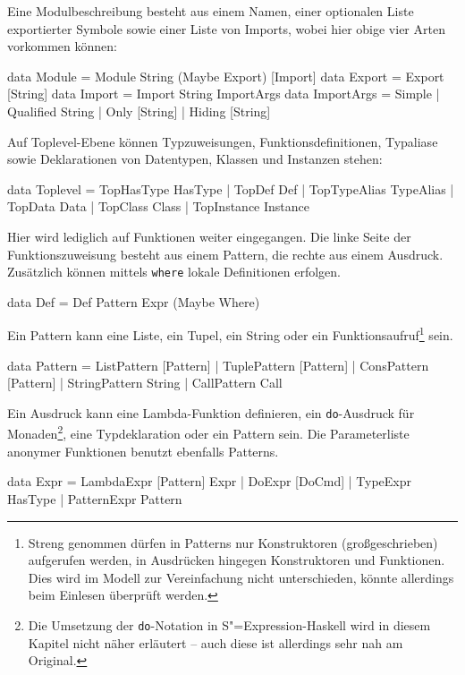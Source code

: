 \documentclass[11pt, a4paper, bibgerm]{scrbook}
\newenvironment{DIFnomarkup}{}{}
\newcommand\icode[1]{\lstinline?#1?}
\newcommand{\sexp}{S"=Expression}
\begin{document}
Eine Modulbeschreibung besteht aus einem Namen, einer optionalen Liste
exportierter Symbole sowie einer Liste von Imports, wobei hier obige
vier Arten vorkommen können:
\begin{DIFnomarkup}\begin{code}
data Module = Module String (Maybe Export) [Import]
data Export = Export [String]
data Import = Import String ImportArgs
data ImportArgs = Simple
                | Qualified String
                | Only [String]
                | Hiding [String]
\end{code}\end{DIFnomarkup}
Auf Toplevel-Ebene können Typzuweisungen, Funktionsdefinitionen,
Typaliase sowie Deklarationen von Datentypen, Klassen und Instanzen stehen:
\begin{DIFnomarkup}\begin{code}
data Toplevel = TopHasType HasType
              | TopDef Def
              | TopTypeAlias TypeAlias
              | TopData Data
              | TopClass Class
              | TopInstance Instance
\end{code}\end{DIFnomarkup}
Hier wird lediglich auf Funktionen weiter eingegangen. Die linke Seite der
Funktionszuweisung besteht aus einem Pattern, die rechte aus einem
Ausdruck. Zusätzlich können mittels \icode{where} lokale Definitionen
erfolgen.
\begin{DIFnomarkup}\begin{code}
data Def = Def Pattern Expr (Maybe Where)
\end{code}\end{DIFnomarkup}
Ein Pattern kann eine Liste, ein Tupel, ein String oder ein
Funktionsaufruf\footnote{Streng genommen dürfen in Patterns nur
  Konstruktoren (großgeschrieben) aufgerufen werden, in Ausdrücken
  hingegen Konstruktoren und Funktionen. Dies wird im Modell zur
  Vereinfachung nicht unterschieden, könnte allerdings beim Einlesen
  überprüft werden.} sein.
\begin{DIFnomarkup}\begin{code}
data Pattern = ListPattern [Pattern]
             | TuplePattern [Pattern]
             | ConsPattern [Pattern]
             | StringPattern String
             | CallPattern Call
\end{code}\end{DIFnomarkup}
Ein Ausdruck kann eine Lambda-Funktion definieren, ein
\icode{do}-Ausdruck für Monaden\footnote{Die Umsetzung der
  \icode{do}-Notation in \sexp{}-Haskell wird in diesem Kapitel nicht
  näher erläutert -- auch diese ist allerdings sehr nah am
  Original.}, eine Typdeklaration oder ein Pattern sein. Die
Parameterliste anonymer Funktionen benutzt ebenfalls Patterns.
\begin{DIFnomarkup}\begin{code}
data Expr = LambdaExpr  [Pattern] Expr
          | DoExpr      [DoCmd]
          | TypeExpr    HasType
          | PatternExpr Pattern
\end{code}\end{DIFnomarkup}
\end{document}
